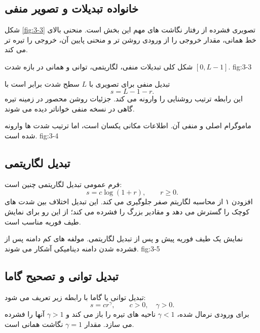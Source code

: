 \subsection{خانواده تبدیلات و تصویر منفی}

شکل \ref{fig:3-3} تصویری فشرده از رفتار نگاشت های مهم این بخش است. منحنی
بالای خط همانی، مقدار خروجی را از ورودی روشن تر و منحنی پایین آن، خروجی را
تیره تر می کند.

{شکل کلی تبدیلات منفی، لگاریتمی، توانی و همانی در بازه شدت
\([0,L-1]\).}
{fig:3-3}

تبدیل منفی برای تصویری با \(L\) سطح شدت برابر است با
\begin{equation}
  s=L-1-r.
  \tag{3-3}\label{eq:3-3}
\end{equation}
این رابطه ترتیب روشنایی را وارونه می کند. جزئیات روشن محصور در زمینه تیره
گاهی در نسخه منفی خواناتر دیده می شوند.

{ماموگرام اصلی و منفی آن. اطلاعات مکانی یکسان است، اما ترتیب شدت ها وارونه
شده است.}
{fig:3-4}

\subsection{تبدیل لگاریتمی}

فرم عمومی تبدیل لگاریتمی چنین است:
\begin{equation}
  s=c\log(1+r), \qquad r\ge 0.
  \tag{3-4}\label{eq:3-4}
\end{equation}
افزودن ۱ از محاسبه لگاریتم صفر جلوگیری می کند. این تبدیل اختلاف بین شدت های
کوچک را گسترش می دهد و مقادیر بزرگ را فشرده می کند؛ از این رو برای نمایش
طیف فوریه مناسب است.

{نمایش یک طیف فوریه پیش و پس از تبدیل لگاریتمی. مولفه های کم دامنه پس از
فشرده شدن دامنه دینامیکی آشکار می شوند.}
{fig:3-5}

\subsection{تبدیل توانی و تصحیح گاما}

تبدیل توانی یا گاما با رابطه زیر تعریف می شود:
\begin{equation}
  s=c r^{\gamma}, \qquad c>0,\quad \gamma>0.
  \tag{3-5}\label{eq:3-5}
\end{equation}
برای ورودی نرمال شده، \(\gamma<1\) ناحیه های تیره را باز می کند و
\(\gamma>1\) آنها را فشرده می سازد. مقدار \(\gamma=1\) نگاشت همانی است.

